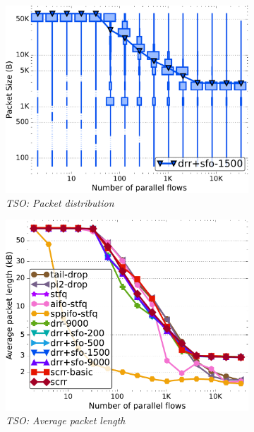 \begin{figure}[t]
  \centering
  \begin{subfigure}[t]{.30\linewidth}
    \centering
    \includegraphics[width=0.95\linewidth]{figs/paral_cn_1t16x1024_gso_pkthist_fq_drr_1500.pdf}
    \caption{\small{\textit{TSO: Packet distribution}}}
    \label{fig:gso-histo-full}
  \end{subfigure}
  \begin{subfigure}[t]{.30\linewidth}
    \centering
    \includegraphics[width=0.95\linewidth]{figs/paral_cn_1t16x1024_gso_skblen_comp_methods.pdf}
    \caption{\small{\textit{TSO: Average packet length}}}
    \label{fig:gso-avg-full}
  \end{subfigure}
  \begin{subfigure}[t]{.30\linewidth}

\end{subfigure}
\end{figure}
